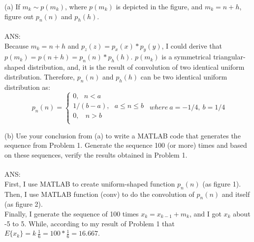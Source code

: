 \documentclass{article}
\begin{document}
(a) If $m_k \sim p(m_k)$, where $p(m_k)$ is depicted  in
 the figure, and $m_k=n+h$, figure out $p_n(n)$ and $p_h(h)$.  \\ \\
ANS:\\
Because $m_k=n+h$ and $p_z(z)=p_x(x)*p_y(y)$, I could derive that $p(m_k)=p(n+h)=p_n(n)*p_h(h)$.
$p(m_k)$ is a symmetrical triangular-shaped distribution, and, it is the result of convolution of 
two identical uniform distribution. Therefore, $p_n(n)$ and $p_h(h)$ can be two identical uniform distribution as:
\begin{equation}
  p_n(n) = \left\{
    \begin{array}{l}
       0, \ \ \ n < a \\
       1/(b-a), \ \ \ a \le n \le b \\
       0, \ \ \ \ n > b \\
    \end{array} \right.
    \ \ where\ a=-1/4,\ b=1/4
\end{equation}

(b) Use your conclusion from (a) to write a MATLAB code that
generates the sequence from Problem 1. Generate the sequence 
100 (or more) times and based on these sequences, verify the
results obtained in Problem 1. \\ \\
ANS:\\
First, I use MATLAB to create uniform-shaped function $p_n(n)$ (as figure 1).
Then, I use MATLAB function (conv) to do the convolution of $p_n(n)$ and itself (as figure 2).\\
Finally, I generate the sequence of 100 times $x_k=x_{k-1}+m_k$, and I got $x_k$ about -5 to 5. 
While, according to my result of Problem 1 that $E\{x_k\}=k\ \frac{1}{6}=100*\frac{1}{6}=16.667$.
\end{document}
